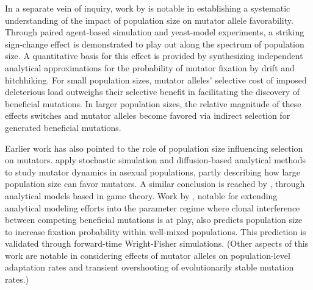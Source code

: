 In a separate vein of inquiry, work by \citet{raynes2018sign} is notable in establishing a systematic understanding of the impact of population size on mutator allele favorability.
Through paired agent-based simulation and yeast-model experiments, a striking sign-change effect is demonstrated to play out along the spectrum of population size.
A quantitative basis for this effect is provided by synthesizing independent analytical approximations for the probability of mutator fixation by drift and hitchhiking.
For small population sizes, mutator alleles' selective cost of imposed deleterious load outweighs their selective benefit in facilitating the discovery of beneficial mutations.
In larger population sizes, the relative magnitude of these effects switches and mutator alleles become favored via indirect selection for generated beneficial mutations.

Earlier work has also pointed to the role of population size influencing selection on mutators.
\citet{wylie2009fixation} apply stochastic simulation and diffusion-based analytical methods to study mutator dynamics in asexual populations, partly describing how large population size can favor mutators.
A similar conclusion is reached by \citet{andre2006evolution}, through analytical models based in game theory.
Work by \citet{good2016evolution}, notable for extending analytical modeling efforts into the parameter regime where clonal interference between competing beneficial mutations is at play, also predicts population size to increase fixation probability within well-mixed populations.
This prediction is validated through forward-time Wright-Fisher simulations.
(Other aspects of this work are notable in considering effects of mutator alleles on population-level adaptation rates and transient overshooting of evolutionarily stable mutation rates.)

